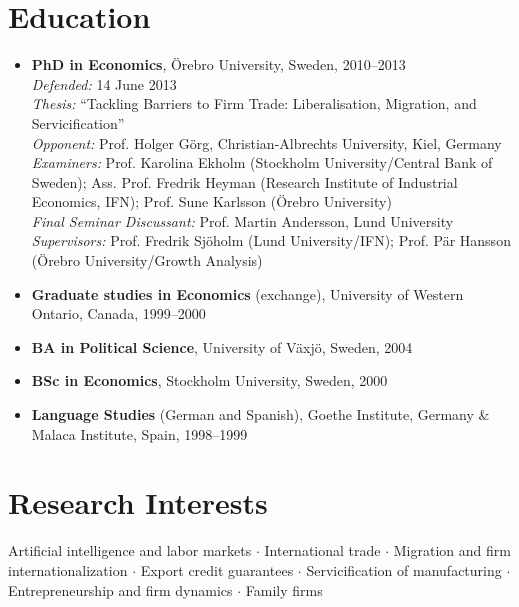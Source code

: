 \documentclass[11pt,a4paper]{article}
\newcommand{\cventry}[1]{\item #1}
\begin{document}
\section{Education}

\begin{itemize}
  \cventry{\textbf{PhD in Economics}, Örebro University, Sweden, 2010--2013\\
  \textit{Defended:} 14 June 2013\\
  \textit{Thesis:} ``Tackling Barriers to Firm Trade: Liberalisation, Migration, and Servicification''\\
  \textit{Opponent:} Prof. Holger Görg, Christian-Albrechts University, Kiel, Germany\\
  \textit{Examiners:} Prof. Karolina Ekholm (Stockholm University/Central Bank of Sweden); Ass. Prof. Fredrik Heyman (Research Institute of Industrial Economics, IFN); Prof. Sune Karlsson (Örebro University)\\
  \textit{Final Seminar Discussant:} Prof. Martin Andersson, Lund University\\
  \textit{Supervisors:} Prof. Fredrik Sjöholm (Lund University/IFN); Prof. Pär Hansson (Örebro University/Growth Analysis)}

  \cventry{\textbf{Graduate studies in Economics} (exchange), University of Western Ontario, Canada, 1999--2000}

  \cventry{\textbf{BA in Political Science}, University of Växjö, Sweden, 2004}

  \cventry{\textbf{BSc in Economics}, Stockholm University, Sweden, 2000}

  \cventry{\textbf{Language Studies} (German and Spanish), Goethe Institute, Germany \& Malaca Institute, Spain, 1998--1999}
\end{itemize}

\section{Research Interests}

Artificial intelligence and labor markets $\cdot$ International trade $\cdot$ Migration and firm internationalization $\cdot$ Export credit guarantees $\cdot$ Servicification of manufacturing $\cdot$ Entrepreneurship and firm dynamics $\cdot$ Family firms
\end{document}
